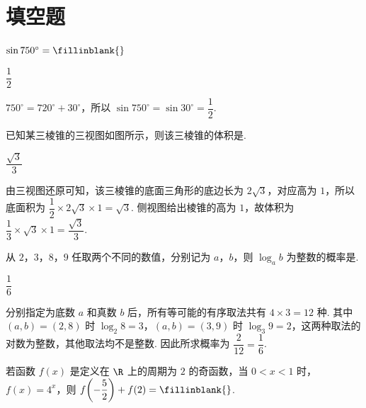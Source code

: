 \section{填空题}

\begin{problem}
\(\sin750^\circ=\fillinblank{}\)
\end{problem}

\begin{answer}
\(\dfrac{1}{2}\)
\end{answer}

\begin{solution}
\(750^\circ=720^\circ+30^\circ\)，所以 \(\sin750^\circ=\sin30^\circ=\dfrac12\).
\end{solution}

\begin{problem}
已知某三棱锥的三视图如图所示，则该三棱锥的体积是\fillinblank{}.

\end{problem}

\begin{answer}
\(\dfrac{\sqrt3}{3}\)
\end{answer}

\begin{solution}
由三视图还原可知，该三棱锥的底面三角形的底边长为 \(2\sqrt3\)，对应高为 \(1\)，所以底面积为 \(\dfrac12\times2\sqrt3\times1=\sqrt3\). 侧视图给出棱锥的高为 \(1\)，故体积为 \(\dfrac13\times\sqrt3\times1=\dfrac{\sqrt3}{3}\).
\end{solution}

\begin{problem}
从 \(2\)，\(3\)，\(8\)，\(9\) 任取两个不同的数值，分别记为 \(a\)，\(b\)，则 \(\log_a b\) 为整数的概率是\fillinblank{}.
\end{problem}

\begin{answer}
\(\dfrac{1}{6}\)
\end{answer}

\begin{solution}
分别指定为底数 \(a\) 和真数 \(b\) 后，所有等可能的有序取法共有 \(4\times3=12\) 种. 其中 \((a,b)=(2,8)\) 时 \(\log_2 8=3\)，\((a,b)=(3,9)\) 时 \(\log_3 9=2\)，这两种取法的对数为整数，其他取法均不是整数. 因此所求概率为 \(\dfrac{2}{12}=\dfrac16\).
\end{solution}

\begin{problem}
若函数 \(f(x)\) 是定义在 \(\R\) 上的周期为 \(2\) 的奇函数，当 \(0<x<1\) 时，\(f(x)=4^x\)，则 \(f\!\left(-\dfrac52\right)+f(2)=\fillinblank{}\).
\end{problem}

